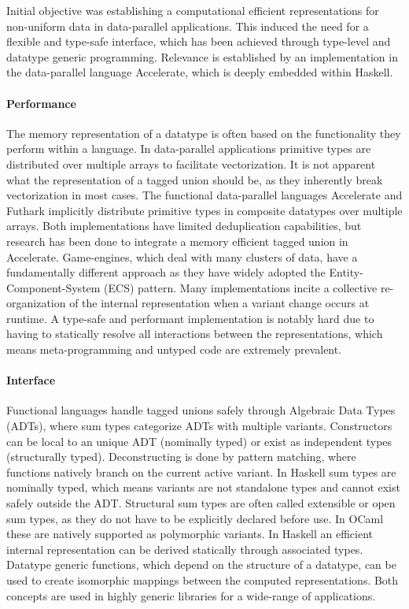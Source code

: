 \documentclass{article}
\begin{document}
Initial objective was establishing a computational efficient representations for non-uniform data in data-parallel applications.
This induced the need for a flexible and type-safe interface, which has been achieved through type-level and datatype generic programming.
Relevance is established by an implementation in the data-parallel language Accelerate, which is deeply embedded within Haskell.

\paragraph{Performance}

The memory representation of a datatype is often based on the functionality they perform within a language.
In data-parallel applications primitive types are distributed over multiple arrays to facilitate vectorization.
It is not apparent what the representation of a tagged union should be, as they inherently break vectorization in most cases. 
The functional data-parallel languages Accelerate\cite{accelerate-sum-types} and Futhark\cite{futhark-sum-types} implicitly distribute primitive types in composite datatypes over multiple arrays.
Both implementations have limited deduplication capabilities, but research has been done to integrate a memory efficient tagged union in Accelerate\cite{accelerate-sum-types}.
Game-engines, which deal with many clusters of data, have a fundamentally different approach as they have widely adopted the Entity-Component-System (ECS) pattern. 
Many implementations incite a collective re-organization of the internal representation when a variant change occurs at runtime.
A type-safe and performant implementation is notably hard due to having to statically resolve all interactions between the representations, which means meta-programming and untyped code are extremely prevalent. 

\paragraph{Interface}

Functional languages handle tagged unions safely through Algebraic Data Types (ADTs), where sum types categorize ADTs with multiple variants.
Constructors can be local to an unique ADT (nominally typed) or exist as independent types (structurally typed).
Deconstructing is done by pattern matching, where functions natively branch on the current active variant.
In Haskell sum types are nominally typed, which means variants are not standalone types and cannot exist safely outside the ADT.
Structural sum types are often called extensible or open sum types, as they do not have to be explicitly declared before use.
In OCaml these are natively supported as polymorphic variants.
In Haskell an efficient internal representation can be derived statically through associated types\cite{associated-types}.
Datatype generic functions, which depend on the structure of a datatype, can be used to create isomorphic mappings between the computed representations.
Both concepts are used in highly generic libraries for a wide-range of applications\cite{generic-programming}. 
\end{document}
